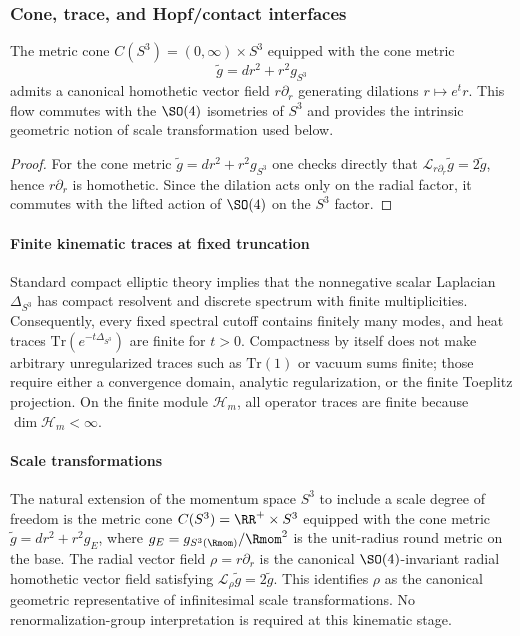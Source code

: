 \documentclass[11pt,a4paper]{article}
\begin{document}
\subsubsection{Cone, trace, and Hopf/contact interfaces}
\begin{proposition}
\label{p2:prop:cone-dilations}
The metric cone $C(S^3)=(0,\infty)\times S^3$ equipped with the cone metric
\[
\tilde g = dr^2 + r^2 g_{S^3}
\]
admits a canonical homothetic vector field $r\partial_r$ generating dilations
$r\mapsto e^t r$. This flow commutes with the $\SO(4)$ isometries of $S^3$ and
provides the intrinsic geometric notion of scale transformation used below.
\end{proposition}

\begin{proof}
For the cone metric $\tilde g=dr^2+r^2 g_{S^3}$ one checks directly that
$\mathcal{L}_{r\partial_r}\tilde g = 2\tilde g$, hence $r\partial_r$ is homothetic.
Since the dilation acts only on the radial factor, it commutes with the lifted
action of $\SO(4)$ on the $S^3$ factor.
\end{proof}



\paragraph{Finite kinematic traces at fixed truncation}
Standard compact elliptic theory
\cite{berline1992heat} implies that the nonnegative scalar Laplacian
\(\Delta_{S^3}\) has compact resolvent and discrete spectrum with finite
multiplicities. Consequently, every fixed spectral cutoff contains finitely
many modes, and heat traces \(\mathrm{Tr}(e^{-t\Delta_{S^3}})\) are finite
for \(t>0\). Compactness by itself does not make arbitrary unregularized
traces such as \(\mathrm{Tr}(1)\) or vacuum sums finite; those require either
a convergence domain, analytic regularization, or the finite Toeplitz
projection. On the finite module \(\mathcal H_m\), all operator traces are
finite because \(\dim\mathcal H_m<\infty\).

\paragraph{Scale transformations}
The natural extension of the momentum space $S^3$ to include a scale degree of freedom is the metric cone $C(S^3) = \RR^+ \times S^3$ equipped with the cone metric $\tilde{g} = dr^2 + r^2 g_E$, where $g_E=g_{S^3(\Rmom)}/\Rmom^2$ is the unit-radius round metric on the base. The radial vector field $\rho = r \partial_r$ is the canonical $\SO(4)$-invariant radial homothetic vector field satisfying $\mathcal{L}_\rho \tilde{g} = 2\tilde{g}$. This identifies $\rho$ as the canonical geometric representative of infinitesimal scale transformations. No renormalization-group interpretation is required at this kinematic stage.
\end{document}
